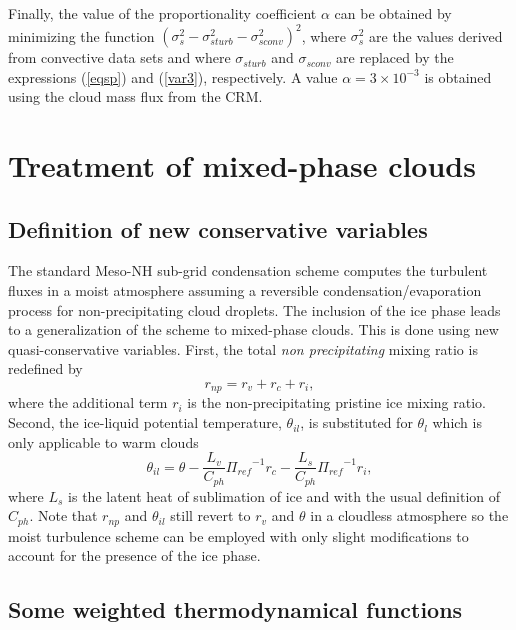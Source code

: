 Finally, the  value of the proportionality coefficient $\alpha$ can be obtained by minimizing the function
$(\sigma_s^2-\sigma_{s  turb}^2-\sigma_{s  conv}^2)^2$, where $\sigma_s^2$ are the  values
derived from convective data sets
and where $\sigma_{s turb}$ and $\sigma_{s conv}$ are replaced by
the expressions (\ref{eqsp}) and (\ref{var3}), respectively.  A value $\alpha=3\times 10^{-3}$ is obtained
using the cloud mass flux from the CRM.


\section{Treatment of mixed-phase clouds}

\subsection{Definition of new conservative variables}

The standard Meso-NH sub-grid condensation scheme computes the turbulent fluxes
in a moist atmosphere assuming a reversible condensation/evaporation process 
for non-precipitating cloud droplets. The inclusion of the ice phase leads to
a generalization of the scheme to mixed-phase clouds. This is done using new
quasi-conservative variables. First, the total {\it non precipitating} mixing 
ratio is redefined by
\begin{equation} \label{newdefrnp}
r_{np} = r_v+r_c+r_i,
\end{equation}
where the additional term $r_i$ is the non-precipitating pristine ice mixing 
ratio. Second, the ice-liquid potential temperature, $\theta_{il}$, is 
substituted for
$\theta_l$ which is only applicable to warm clouds 
\begin{equation} \label{defthetail}
\theta_{il} = \theta - {\dfrac{L_v}{C_{ph}}{\Pi_{ref}}^{-1}r_c} 
                   - {\dfrac{L_s}{C_{ph}}{\Pi_{ref}}^{-1}r_i},
\end{equation}
where $L_s$ is the latent heat of sublimation of ice and with the usual
definition of $C_{ph}$. Note that $r_{np}$ and $\theta_{il}$ still revert to 
$r_v$ and $\theta$ in a cloudless atmosphere so the moist turbulence scheme 
can be employed with only slight modifications to account for the presence of 
the ice phase. 

\subsection{Some weighted thermodynamical functions}

